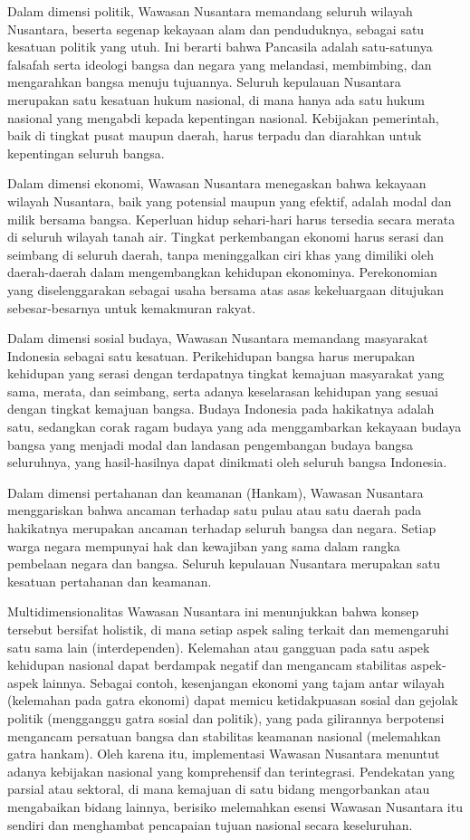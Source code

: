 \documentclass[12pt, a4paper]{article}
\begin{document}
Dalam dimensi politik, Wawasan Nusantara memandang seluruh wilayah Nusantara, beserta segenap kekayaan alam dan penduduknya, sebagai satu kesatuan politik yang utuh. Ini berarti bahwa Pancasila adalah satu-satunya falsafah serta ideologi bangsa dan negara yang melandasi, membimbing, dan mengarahkan bangsa menuju tujuannya. Seluruh kepulauan Nusantara merupakan satu kesatuan hukum nasional, di mana hanya ada satu hukum nasional yang mengabdi kepada kepentingan nasional. Kebijakan pemerintah, baik di tingkat pusat maupun daerah, harus terpadu dan diarahkan untuk kepentingan seluruh bangsa.  

Dalam dimensi ekonomi, Wawasan Nusantara menegaskan bahwa kekayaan wilayah Nusantara, baik yang potensial maupun yang efektif, adalah modal dan milik bersama bangsa. Keperluan hidup sehari-hari harus tersedia secara merata di seluruh wilayah tanah air. Tingkat perkembangan ekonomi harus serasi dan seimbang di seluruh daerah, tanpa meninggalkan ciri khas yang dimiliki oleh daerah-daerah dalam mengembangkan kehidupan ekonominya. Perekonomian yang diselenggarakan sebagai usaha bersama atas asas kekeluargaan ditujukan sebesar-besarnya untuk kemakmuran rakyat.  

Dalam dimensi sosial budaya, Wawasan Nusantara memandang masyarakat Indonesia sebagai satu kesatuan. Perikehidupan bangsa harus merupakan kehidupan yang serasi dengan terdapatnya tingkat kemajuan masyarakat yang sama, merata, dan seimbang, serta adanya keselarasan kehidupan yang sesuai dengan tingkat kemajuan bangsa. Budaya Indonesia pada hakikatnya adalah satu, sedangkan corak ragam budaya yang ada menggambarkan kekayaan budaya bangsa yang menjadi modal dan landasan pengembangan budaya bangsa seluruhnya, yang hasil-hasilnya dapat dinikmati oleh seluruh bangsa Indonesia.  

Dalam dimensi pertahanan dan keamanan (Hankam), Wawasan Nusantara menggariskan bahwa ancaman terhadap satu pulau atau satu daerah pada hakikatnya merupakan ancaman terhadap seluruh bangsa dan negara. Setiap warga negara mempunyai hak dan kewajiban yang sama dalam rangka pembelaan negara dan bangsa. Seluruh kepulauan Nusantara merupakan satu kesatuan pertahanan dan keamanan.  

Multidimensionalitas Wawasan Nusantara ini menunjukkan bahwa konsep tersebut bersifat holistik, di mana setiap aspek saling terkait dan memengaruhi satu sama lain (interdependen). Kelemahan atau gangguan pada satu aspek kehidupan nasional dapat berdampak negatif dan mengancam stabilitas aspek-aspek lainnya. Sebagai contoh, kesenjangan ekonomi yang tajam antar wilayah (kelemahan pada gatra ekonomi) dapat memicu ketidakpuasan sosial dan gejolak politik (mengganggu gatra sosial dan politik), yang pada gilirannya berpotensi mengancam persatuan bangsa dan stabilitas keamanan nasional (melemahkan gatra hankam). Oleh karena itu, implementasi Wawasan Nusantara menuntut adanya kebijakan nasional yang komprehensif dan terintegrasi. Pendekatan yang parsial atau sektoral, di mana kemajuan di satu bidang mengorbankan atau mengabaikan bidang lainnya, berisiko melemahkan esensi Wawasan Nusantara itu sendiri dan menghambat pencapaian tujuan nasional secara keseluruhan.  
\end{document}
